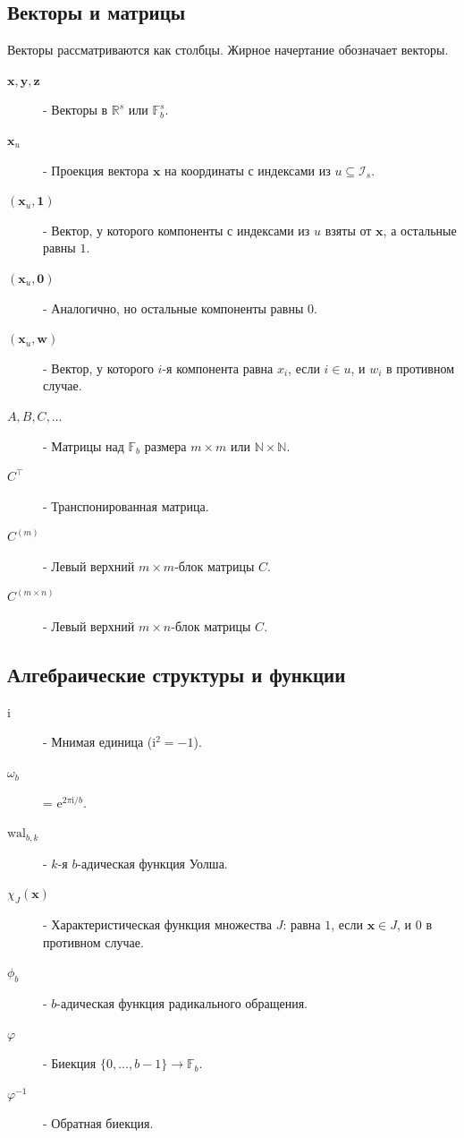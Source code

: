 \documentclass[12pt, a4paper]{article}
\theoremstyle{plain}
\theoremstyle{definition}
\theoremstyle{remark}
\newcommand{\eb}{\mathrm{e}}
\newcommand{\NN}{\mathbb{N}}
\newcommand{\RR}{\mathbb{R}}
\newcommand{\FF}{\mathbb{F}}
\newcommand{\Is}{\mathcal{I}_s}
\newcommand{\vx}{\boldsymbol{x}}
\newcommand{\vy}{\boldsymbol{y}}
\newcommand{\vz}{\boldsymbol{z}}
\newcommand{\vw}{\boldsymbol{w}}
\newcommand{\vzero}{\boldsymbol{0}}
\newcommand{\vone}{\boldsymbol{1}}
\begin{document}
\subsection*{Векторы и матрицы}
Векторы рассматриваются как столбцы. Жирное начертание обозначает векторы.
\begin{description}
    \item[$\vx, \vy, \vz$] - Векторы в $\RR^s$ или $\FF_b^s$.
    \item[$\vx_u$] - Проекция вектора $\vx$ на координаты с индексами из $u \subseteq \Is$.
    \item[$( \vx_u, \vone )$] - Вектор, у которого компоненты с индексами из $u$ взяты от $\vx$, а остальные равны $1$.
    \item[$( \vx_u, \vzero )$] - Аналогично, но остальные компоненты равны $0$.
    \item[$( \vx_u, \vw )$] - Вектор, у которого $i$-я компонента равна $x_i$, если $i \in u$, и $w_i$ в противном случае.
    \item[$A, B, C, \dots$] - Матрицы над $\FF_b$ размера $m \times m$ или $\NN \times \NN$.
    \item[$C^\top$] - Транспонированная матрица.
    \item[$C^{(m)}$] - Левый верхний $m \times m$-блок матрицы $C$.
    \item[$C^{(m \times n)}$] - Левый верхний $m \times n$-блок матрицы $C$.
\end{description}

\subsection*{Алгебраические структуры и функции}
\begin{description}
    \item[$\mathrm{i}$] - Мнимая единица ($\mathrm{i}^2 = -1$).
    \item[$\omega_b$] = $\eb^{2\pi \mathrm{i}/b}$.
    \item[$\mathrm{wal}_{b,k}$] - $k$-я $b$-адическая функция Уолша.
    \item[$\chi_J(\vx)$] - Характеристическая функция множества $J$: равна $1$, если $\vx \in J$, и $0$ в противном случае.
    \item[$\phi_b$] - $b$-адическая функция радикального обращения.
    \item[$\varphi$] - Биекция $\{0, \dots, b-1\} \to \FF_b$.
    \item[$\varphi^{-1}$] - Обратная биекция.
\end{description}
\end{document}
